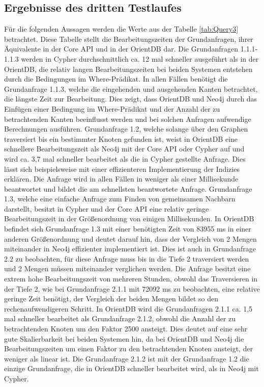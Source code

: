 \subsection{Ergebnisse des dritten Testlaufes}
Für die folgenden Aussagen werden die Werte aus der Tabelle \ref{tab:Query3}  betrachtet. Diese Tabelle stellt die Bearbeitungszeiten der Grundanfragen, ihrer Äquivalente in der Core API und in der OrientDB dar. \newline
Die Grundanfragen 1.1.1-1.1.3 werden in Cypher durchschnittlich ca. 12 mal schneller ausgeführt als in der OrientDB, die relativ langen Bearbeitungszeiten bei beiden Systemen entstehen durch die Bedingungen im Where-Prädikat. In allen Fällen benötigt die Grundanfrage 1.1.3, welche die eingehenden und ausgehenden Kanten betrachtet, die längste Zeit zur Bearbeitung. Dies zeigt, dass OrientDB und Neo4j durch das Einfügen einer Bedingung im Where-Prädikat und der Anzahl der zu betrachtenden Kanten beeinflusst werden und bei solchen Anfragen aufwendige Berechnungen ausführen. \newline
 Grundanfrage 1.2, welche solange über den Graphen traversiert bis ein bestimmter Knoten gefunden ist, weist in OrientDB eine schnellere Bearbeitungszeit als Neo4j mit der Core API oder Cypher auf und wird ca. 3,7 mal schneller bearbeitet als die in Cypher gestellte Anfrage. Dies lässt sich beispielsweise mit einer effizienteren Implementierung der Indizies erklären. Die Anfrage wird in allen Fällen in weniger als einer Millisekunde beantwortet und bildet die am schnellsten beantwortete Anfrage. \newline
Grundanfrage 1.3, welche eine einfache Anfrage zum Finden von gemeinsamen Nachbarn darstellt, besitzt in Cypher und der Core API eine relativ geringe Bearbeitungszeit in der Größenordnung von einigen Millisekunden. In OrientDB befindet sich Grundanfrage 1.3 mit einer benötigten Zeit von 83955 ms in einer anderen Größenordnung und deutet darauf hin, dass der Vergleich von 2 Mengen miteinander in Neo4j effizienter implementiert ist. Dies ist auch in Grundanfrage 2.2 zu beobachten, für diese Anfrage muss bis in die Tiefe 2 traversiert werden und 2 Mengen müssen miteinander verglichen werden. Die Anfrage besitzt eine extrem hohe Bearbeitungszeit von mehreren Stunden, obwohl das Traversieren in der Tiefe 2, wie bei Grundanfrage 2.1.1 mit 72092 ms zu beobachten, eine relative geringe Zeit benötigt, der Vergleich der beiden Mengen bildet so den rechenaufwendigeren Schritt. \newline
 In OrientDB wird die Grundanfragen 2.1.1  ca. 1,5 mal schneller bearbeitet als Grundanfrage 2.1.2, obwohl die Anzahl der zu betrachtenden  Knoten um den Faktor 2500 ansteigt. Dies deutet auf eine sehr gute Skalierbarkeit bei beiden Systemen hin, da bei OrientDB und Neo4j die Bearbeitungszeiten um einen Faktor zu den betrachtenden Knoten ansteigt, der weniger als linear ist. Die Grundanfrage 2.1.2 ist mit der Grundanfrage 1.2 die einzige Grundanfrage, die in OrientDB schneller bearbeitet wird, als in Neo4j mit Cypher. \newline  

